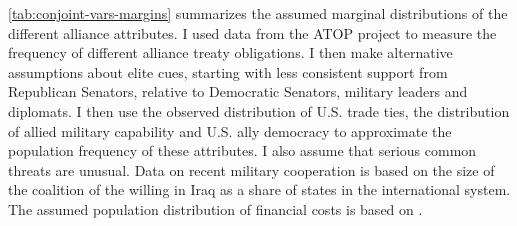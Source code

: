 \documentclass[12pt]{article}
\begin{document}
\autoref{tab:conjoint-vars-margins} summarizes the assumed marginal distributions of the different alliance attributes. 
I used data from the ATOP project \citep{Leedsetal2002} to measure the frequency of different alliance treaty obligations. 
I then make alternative assumptions about elite cues, starting with less consistent support from Republican Senators, relative to Democratic Senators, military leaders and diplomats. 
I then use the observed distribution of U.S. trade ties, the distribution of allied military capability and U.S. ally democracy to approximate the population frequency of these attributes. 
I also assume that serious common threats are unusual. 
Data on recent military cooperation is based on the size of the coalition of the willing in Iraq as a share of states in the international system. 
The assumed population distribution of financial costs is based on \citep{AlleyFuhrmann2021}. 
\end{document}
